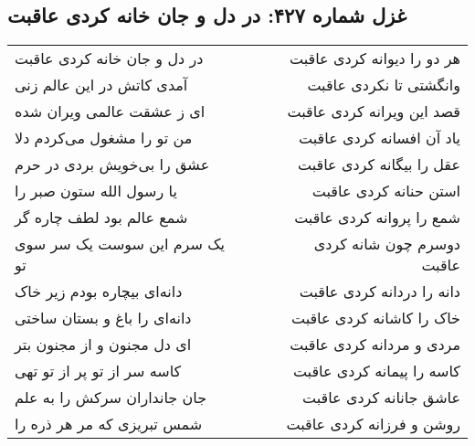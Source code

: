 \begin{center}
\section*{غزل شماره ۴۲۷: در دل و جان خانه کردی عاقبت}
\label{sec:0427}
\begin{longtable}{l p{0.5cm} r}
در دل و جان خانه کردی عاقبت
&&
هر دو را دیوانه کردی عاقبت
\\
آمدی کاتش در این عالم زنی
&&
وانگشتی تا نکردی عاقبت
\\
ای ز عشقت عالمی ویران شده
&&
قصد این ویرانه کردی عاقبت
\\
من تو را مشغول می‌کردم دلا
&&
یاد آن افسانه کردی عاقبت
\\
عشق را بی‌خویش بردی در حرم
&&
عقل را بیگانه کردی عاقبت
\\
یا رسول الله ستون صبر را
&&
استن حنانه کردی عاقبت
\\
شمع عالم بود لطف چاره گر
&&
شمع را پروانه کردی عاقبت
\\
یک سرم این سوست یک سر سوی تو
&&
دوسرم چون شانه کردی عاقبت
\\
دانه‌ای بیچاره بودم زیر خاک
&&
دانه را دردانه کردی عاقبت
\\
دانه‌ای را باغ و بستان ساختی
&&
خاک را کاشانه کردی عاقبت
\\
ای دل مجنون و از مجنون بتر
&&
مردی و مردانه کردی عاقبت
\\
کاسه سر از تو پر از تو تهی
&&
کاسه را پیمانه کردی عاقبت
\\
جان جانداران سرکش را به علم
&&
عاشق جانانه کردی عاقبت
\\
شمس تبریزی که مر هر ذره را
&&
روشن و فرزانه کردی عاقبت
\\
\end{longtable}
\end{center}
